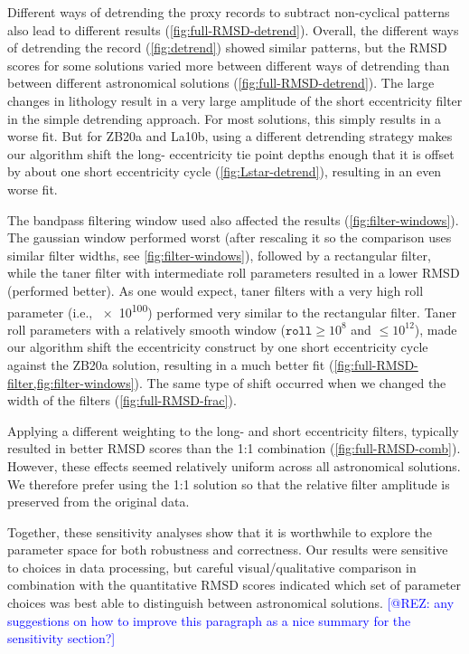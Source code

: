 \documentclass[draft]{agujournal2019}
\newcommand{\ijk}{\textcolor{blue}}
\begin{document}
Different ways of detrending the proxy records to subtract non-cyclical patterns also lead to different results (\cref{fig:full-RMSD-detrend}).
Overall, the different ways of detrending the record (\cref{fig:detrend}) showed similar patterns, but the \gls{RMSD} scores for some solutions varied more between different ways of detrending than between different astronomical solutions (\cref{fig:full-RMSD-detrend}).
The large changes in lithology result in a very large amplitude of the short eccentricity filter in the simple detrending approach.
For most solutions, this simply results in a worse fit.
But for ZB20a and La10b, using a different detrending strategy makes our algorithm shift the long- eccentricity tie point depths enough that it is offset by about one short eccentricity cycle (\cref{fig:Lstar-detrend}), resulting in an even worse fit.

The bandpass filtering window used also affected the results (\cref{fig:filter-windows}).
The gaussian window performed worst (after rescaling it so the comparison uses similar filter widths, see \cref{fig:filter-windows}), followed by a rectangular filter, while the taner filter with intermediate roll parameters resulted in a lower \gls{RMSD} (performed better).
As one would expect, taner filters with a very high roll parameter (i.e., \num{e100}) performed very similar to the rectangular filter.
Taner roll parameters with a relatively smooth window (\(\texttt{roll} \ge 10^{8}\) and \(\le 10^{12}\)), made our algorithm shift the eccentricity construct by one short eccentricity cycle against the ZB20a solution, resulting in a much better fit (\cref{fig:full-RMSD-filter,fig:filter-windows}).
The same type of shift occurred when we changed the width of the filters (\cref{fig:full-RMSD-frac}).

Applying a different weighting to the long- and short eccentricity filters, typically resulted in better \gls{RMSD} scores than the 1:1 combination (\cref{fig:full-RMSD-comb}).
However, these effects seemed relatively uniform across all astronomical solutions.
We therefore prefer using the 1:1 solution so that the relative filter amplitude is preserved from the original data.

Together, these sensitivity analyses show that it is worthwhile to explore the parameter space for both robustness and correctness.
Our results were sensitive to choices in data processing, but careful visual/qualitative comparison in combination with the quantitative \gls{RMSD} scores indicated which set of parameter choices was best able to distinguish between astronomical solutions.
\ijk{[@REZ: any suggestions on how to improve this paragraph as a nice summary for the sensitivity section?]}
\end{document}
